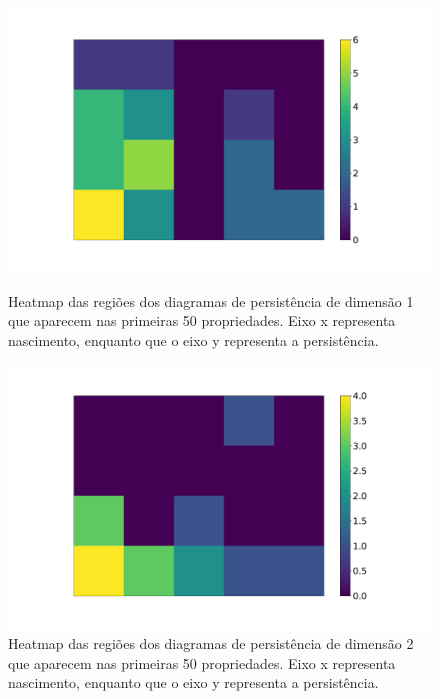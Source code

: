 \begin{figure}[htpb!]
    \begin{minipage}{0.5\textwidth}
        \centering
        \includegraphics[width=1.1\textwidth]{images/heatmap_1.pdf}
        \caption{Heatmap das regiões dos diagramas de persistência de dimensão 1 que aparecem
        nas primeiras 50 propriedades. Eixo x representa nascimento, enquanto que o eixo y 
        representa a persistência.}
        \label{fig:count_pd}
        \fautor
    \end{minipage}
    \begin{minipage}{0.5\textwidth}
        \centering
        \includegraphics[width=1.1\textwidth]{images/heatmap_2.pdf}
        \caption{Heatmap das regiões dos diagramas de persistência de dimensão 2 que aparecem
        nas primeiras 50 propriedades. Eixo x representa nascimento, enquanto que o eixo y 
        representa a persistência.}
        \label{fig:count_pd2}
        \fautor
    \end{minipage}
\end{figure}
 

